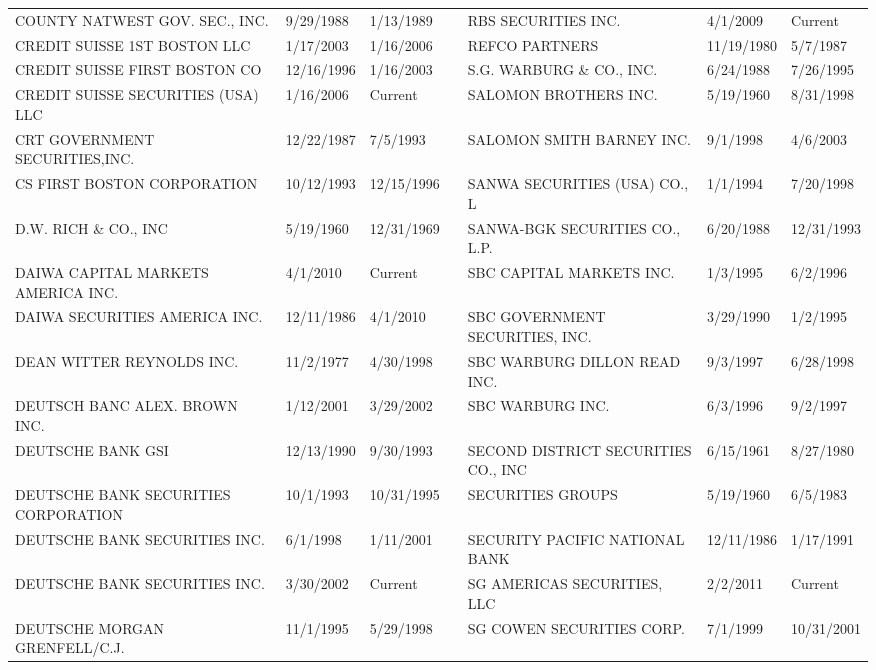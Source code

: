 \documentclass{article}
\begin{document}
\begin{adjustbox}{max width=\textwidth}
\begin{tabular}{lllllll}
COUNTY NATWEST GOV. SEC., INC.       & 9/29/1988 & 1/13/1989 &  & RBS SECURITIES INC. & 4/1/2009 & Current \\
CREDIT SUISSE 1ST BOSTON LLC    & 1/17/2003 & 1/16/2006 &  & REFCO PARTNERS                      & 11/19/1980 & 5/7/1987 \\
CREDIT SUISSE FIRST BOSTON CO       & 12/16/1996 & 1/16/2003 &  & S.G. WARBURG \& CO., INC.             & 6/24/1988 & 7/26/1995 \\
CREDIT SUISSE SECURITIES (USA) LLC & 1/16/2006 & Current &  & SALOMON BROTHERS INC.               & 5/19/1960 & 8/31/1998 \\
CRT GOVERNMENT SECURITIES,INC.      & 12/22/1987 & 7/5/1993 &  & SALOMON SMITH BARNEY INC.       & 9/1/1998 & 4/6/2003 \\
CS FIRST BOSTON CORPORATION         & 10/12/1993 & 12/15/1996 &  & SANWA SECURITIES (USA) CO., L       & 1/1/1994 & 7/20/1998 \\
D.W. RICH \& CO., INC                 & 5/19/1960 & 12/31/1969 &  & SANWA-BGK SECURITIES CO., L.P.      & 6/20/1988 & 12/31/1993 \\
DAIWA CAPITAL MARKETS AMERICA INC. & 4/1/2010 & Current &  & SBC CAPITAL MARKETS INC.        & 1/3/1995 & 6/2/1996 \\
DAIWA SECURITIES AMERICA INC.       & 12/11/1986 & 4/1/2010 &  & SBC GOVERNMENT SECURITIES, INC. & 3/29/1990 & 1/2/1995 \\
DEAN WITTER REYNOLDS INC.           & 11/2/1977 & 4/30/1998 &  & SBC WARBURG DILLON READ INC.    & 9/3/1997 & 6/28/1998 \\
DEUTSCH BANC ALEX. BROWN INC.        & 1/12/2001 & 3/29/2002 &  & SBC WARBURG INC.                & 6/3/1996 & 9/2/1997 \\
DEUTSCHE BANK GSI                    & 12/13/1990 & 9/30/1993 &  & SECOND DISTRICT SECURITIES CO., INC  & 6/15/1961 & 8/27/1980 \\
DEUTSCHE BANK SECURITIES CORPORATION & 10/1/1993 & 10/31/1995 &  & SECURITIES GROUPS                    & 5/19/1960 & 6/5/1983 \\
DEUTSCHE BANK SECURITIES INC.        & 6/1/1998 & 1/11/2001 &  & SECURITY PACIFIC NATIONAL BANK       & 12/11/1986 & 1/17/1991 \\
DEUTSCHE BANK SECURITIES INC.        & 3/30/2002 & Current &  & SG AMERICAS SECURITIES, LLC & 2/2/2011 & Current \\
DEUTSCHE MORGAN GRENFELL/C.J.        & 11/1/1995 & 5/29/1998 &  & SG COWEN SECURITIES CORP.           & 7/1/1999 & 10/31/2001 \\

\end{tabular}
\end{adjustbox}
\end{document}
